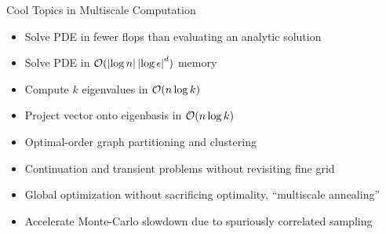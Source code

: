 \begin{frame}{Cool Topics in Multiscale Computation}
  \begin{multicols}{2}
    \begin{itemize}
    \item Solve PDE in fewer flops than evaluating an analytic solution
    \item Solve PDE in $\mathcal{O}(\left\lvert \log n \right\rvert\left\lvert \log \epsilon \right\rvert^d)$ memory
    \item Compute $k$ eigenvalues in $\mathcal{O}(n \log k)$
    \item Project vector onto eigenbasis in $\mathcal{O}(n \log k)$
    \item Optimal-order graph partitioning and clustering
    \item Continuation and transient problems without revisiting fine grid
    \item Global optimization without sacrificing optimality, ``multiscale annealing''
    \item Accelerate Monte-Carlo slowdown due to spuriously correlated sampling
    \end{itemize}
  \end{multicols}
\end{frame}
